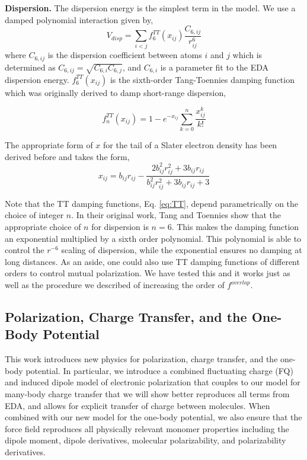 \documentclass[journal=jctcce,manuscript=article]{achemso}
\begin{document}
\textbf{Dispersion.} The dispersion energy is the simplest term in the model. We use a damped
polynomial interaction given by,
\begin{equation}
  V_{disp}=\sum_{i<j}f_6^{TT}(x_{ij})\frac{C_{6,ij}}{r_{ij}^6}
  \label{eq:disp}
\end{equation}
\noindent
where $C_{6,ij}$ is the dispersion coefficient between atoms
$i$ and $j$ which is determined as $C_{6,ij}=\sqrt{C_{6,i}C_{6,j}}$, and $C_{6,i}$ is
a parameter fit to the EDA dispersion energy. $f_6^{TT}(x_{ij})$ is the sixth-order
Tang-Toennies damping function\cite{tang1984improved} which was originally derived
to damp short-range dispersion,

\begin{equation}
  f_n^{TT}(x_{ij}) = 1-e^{-x_{ij}}\sum_{k=0}^n\frac{x_{ij}^k}{k!}
  \label{eq:TT}
\end{equation}

The appropriate form of $x$ for the tail of a Slater electron density
has been derived before\cite{van2016beyond} and takes the form,
\begin{equation}
  x_{ij}=b_{ij}r_{ij}-\frac{2b_{ij}^2r_{ij}^2+3b_{ij}r_{ij}}{b_{ij}^2r_{ij}^2+3b_{ij}r_{ij}+3}
  \label{eq:TT_x}
\end{equation}

Note that the TT damping functions, Eq. \ref{eq:TT}, depend parametrically on
the choice of integer $n$. In their original work, Tang and Toennies show that the appropriate choice
of $n$ for dispersion is $n=6$. This makes the damping function an exponential multiplied by a sixth order polynomial.
This polynomial is able to control the $r^{-6}$ scaling of dispersion, while the exponential ensures no
damping at long distances. As an aside, one could also use TT damping functions of different orders to control
mutual polarization. We have tested this and it works just as well as the procedure we
described of increasing the order of $f^{overlap}$.

\subsection*{Polarization, Charge Transfer, and the One-Body Potential}
This work introduces new physics for polarization, charge transfer, and the one-body potential. In particular, we introduce a combined fluctuating charge (FQ) and induced dipole model of electronic
polarization that couples to our model for many-body charge transfer that we will show better reproduces all terms from EDA, and allows for explicit transfer of charge between molecules. When combined with our new model for the one-body potential, we also ensure that the force field reproduces
all physically relevant monomer properties including the dipole moment, dipole derivatives,
molecular polarizability, and polarizability derivatives. 
\end{document}
